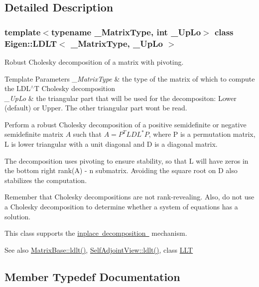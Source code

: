 \subsection{Detailed Description}
\subsubsection*{template$<$typename \+\_\+\+Matrix\+Type, int \+\_\+\+Up\+Lo$>$\newline
class Eigen\+::\+L\+D\+L\+T$<$ \+\_\+\+Matrix\+Type, \+\_\+\+Up\+Lo $>$}

Robust Cholesky decomposition of a matrix with pivoting. 


\begin{DoxyTemplParams}{Template Parameters}
{\em \+\_\+\+Matrix\+Type} & the type of the matrix of which to compute the L\+D\+L$^\wedge$T Cholesky decomposition \\
\hline
{\em \+\_\+\+Up\+Lo} & the triangular part that will be used for the decompositon\+: Lower (default) or Upper. The other triangular part won\textquotesingle{}t be read.\\
\hline
\end{DoxyTemplParams}
Perform a robust Cholesky decomposition of a positive semidefinite or negative semidefinite matrix $ A $ such that $ A = P^TLDL^*P $, where P is a permutation matrix, L is lower triangular with a unit diagonal and D is a diagonal matrix.

The decomposition uses pivoting to ensure stability, so that L will have zeros in the bottom right rank(\+A) -\/ n submatrix. Avoiding the square root on D also stabilizes the computation.

Remember that Cholesky decompositions are not rank-\/revealing. Also, do not use a Cholesky decomposition to determine whether a system of equations has a solution.

This class supports the \mbox{\hyperlink{}{inplace decomposition }} mechanism.

\begin{DoxySeeAlso}{See also}
\mbox{\hyperlink{class_eigen_1_1_matrix_base_a0ecf058a0727a4cab8b42d79e95072e1}{Matrix\+Base\+::ldlt()}}, \mbox{\hyperlink{class_eigen_1_1_self_adjoint_view_a644155eef17b37c95d85b9f65bb49ac4}{Self\+Adjoint\+View\+::ldlt()}}, class \mbox{\hyperlink{class_eigen_1_1_l_l_t}{L\+LT}} 
\end{DoxySeeAlso}


\subsection{Member Typedef Documentation}
\mbox{\label{class_eigen_1_1_l_d_l_t_ad9c57eb2fb3bbccd51b9d2e111bea355}} 
